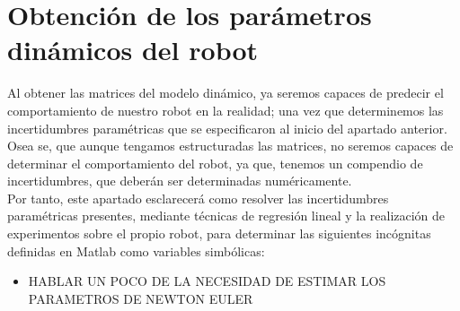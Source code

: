 \section{Obtención de los parámetros dinámicos del robot}

Al obtener las matrices del modelo dinámico, ya seremos capaces de predecir el comportamiento de nuestro robot en la realidad;
una vez que determinemos las incertidumbres paramétricas que se especificaron al inicio del apartado anterior.
Osea se, que aunque tengamos estructuradas las matrices, no seremos capaces de determinar el comportamiento
del robot, ya que, tenemos un compendio de incertidumbres, que deberán ser determinadas numéricamente.\\


Por tanto, este apartado esclarecerá como resolver las incertidumbres paramétricas presentes, mediante
técnicas de regresión lineal y la realización de experimentos sobre el propio robot, para determinar las siguientes
incógnitas definidas en Matlab como variables simbólicas:

\begin{itemize}
	\item HABLAR UN POCO DE LA NECESIDAD DE ESTIMAR LOS PARAMETROS DE NEWTON EULER

\end{itemize}

%

